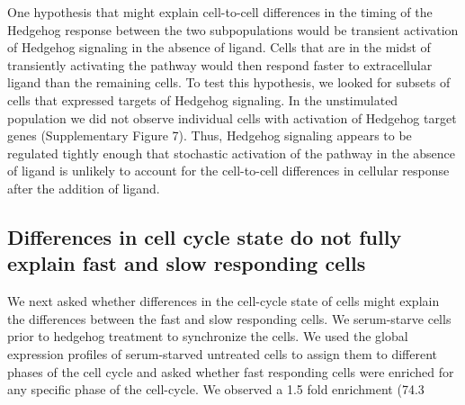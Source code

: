 One hypothesis that might explain cell-to-cell differences in the timing of the Hedgehog response between the two subpopulations would be transient activation of Hedgehog signaling in the absence of ligand. Cells that are in the midst of transiently activating the pathway would then respond faster to extracellular ligand than the remaining cells. To test this hypothesis, we looked for subsets of cells that expressed targets of Hedgehog signaling. In the unstimulated population we did not observe individual cells with activation of Hedgehog target genes (Supplementary Figure 7). Thus, Hedgehog signaling appears to be regulated tightly enough that stochastic activation of the pathway in the absence of ligand is unlikely to account for the cell-to-cell differences in cellular response after the addition of ligand.

\subsection{Differences in cell cycle state do not fully explain fast and slow responding cells}

We next asked whether differences in the cell-cycle state of cells might explain the differences between the fast and slow responding cells. We serum-starve cells prior to hedgehog treatment to synchronize the cells. We used the global expression profiles of serum-starved untreated cells to assign them to different phases of the cell cycle and asked whether fast responding cells were enriched for any specific phase of the cell-cycle. We observed a 1.5 fold enrichment (74.3%
